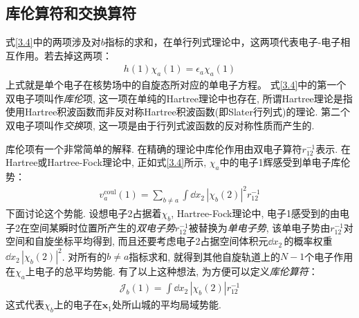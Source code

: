 \subsection{库伦算符和交换算符}
式\eqref{3.4}中的两项涉及对$b$指标的求和，在单行列式理论中，这两项代表电子-电子相互作用。若去掉这两项：
\begin{align}
h(1)\chi_a(1) = \epsilon_a\chi_a(1)
\end{align}
上式就是单个电子在核势场中的自旋态所对应的单电子\sch 方程。 式\eqref{3.4}中的第一个双电子项叫作\emph{库伦}项, 这一项在单纯的Hartree理论中也存在, 所谓Hartree理论是指使用Hartree积波函数而非反对称Hartree积波函数(即Slater行列式)的理论. 第二个双电子项叫作\emph{交换}项, 这一项是由于行列式波函数的反对称性质而产生的.

库伦项有一个非常简单的解释. 在精确的理论中库伦作用由双电子算符$r_{12}^{-1}$表示. 在Hartree或Hartree-Fock理论中, 正如式\eqref{3.4}所示, $\chi_a$中的电子1辉感受到单电子库伦势：
\begin{align}
v_a^\mathrm{coul}(1) = \sum_{b\neq a} \int\dd{x}_2\,|\chi_b(2)|^2 r_{12}^{-1}
\end{align}
下面讨论这个势能. 设想电子$2$占据着$\chi_b$, Hartree-Fock理论中, 电子1感受到的由电子2在空间某瞬时位置所产生的\emph{双电子势$r_{12}^{-1}$}被替换为\emph{单电子势}, 该单电子势由$r_{12}^{-1}$对空间和自旋坐标平均得到, 而且还要考虑电子2占据空间体积元$\dd{x}_2\,$的概率权重$\dd{x}_2\,|\chi_b(2)|^2$. 对所有的$b\neq a$指标求和, 就得到其他自旋轨道上的$N-1$个电子作用在$\chi_a$上电子的总平均势能. 有了以上这种想法, 为方便可以定义\emph{库伦算符}：
\begin{align}
\mathscr{J}_b(1) = \int\dd{x}_2\,|\chi_b(2)|r_{12}^{-1}
\end{align}
这式代表$\chi_b$上的电子在$\mathbf{x}_1$处所山城的平均局域势能.

